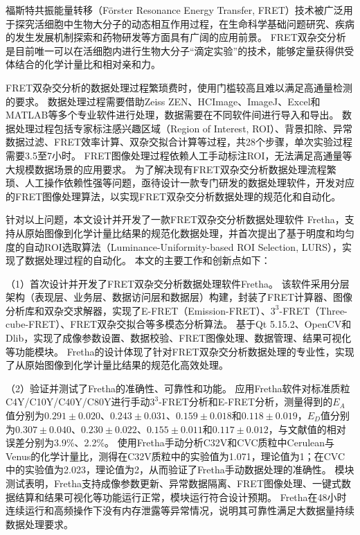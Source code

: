 \begin{cabstract}
福斯特共振能量转移（Förster Resonance Energy Transfer, FRET）技术被广泛用于探究活细胞中生物大分子的动态相互作用过程，在生命科学基础问题研究、疾病的发生发展机制探索和药物研发等方面具有广阔的应用前景。
FRET双杂交分析是目前唯一可以在活细胞内进行生物大分子“滴定实验”的技术，能够定量获得供受体结合的化学计量比和相对亲和力。

FRET双杂交分析的数据处理过程繁琐费时，使用门槛较高且难以满足高通量检测的要求。
数据处理过程需要借助Zeiss ZEN、HCImage、ImageJ、Excel和MATLAB等多个专业软件进行处理，数据需要在不同软件间进行导入和导出。
数据处理过程包括专家标注感兴趣区域（Region of Interest, ROI）、背景扣除、异常数据过滤、FRET效率计算、双杂交拟合计算等过程，共28个步骤，单次实验过程需要3.5至7小时。
FRET图像处理过程依赖人工手动标注ROI，无法满足高通量等大规模数据场景的应用要求。
为了解决现有FRET双杂交分析数据处理流程繁琐、人工操作依赖性强等问题，亟待设计一款专门研发的数据处理软件，开发对应的FRET图像处理算法，以实现FRET双杂交分析数据处理的规范化和自动化。

针对以上问题，本文设计并开发了一款FRET双杂交分析数据处理软件 Fretha，支持从原始图像到化学计量比结果的规范化数据处理，并首次提出了基于明度和均匀度的自动ROI选取算法（Luminance-Uniformity-based ROI Selection, LURS），实现了数据处理过程的自动化。
本文的主要工作和创新点如下：

（1）首次设计并开发了FRET双杂交分析数据处理软件Fretha。
该软件采用分层架构（表现层、业务层、数据访问层和数据层）构建，封装了FRET计算器、图像分析库和双杂交求解器，实现了E-FRET（Emission-FRET）、$3^3$-FRET（Three-cube-FRET）、FRET双杂交拟合等多模态分析算法。
基于Qt 5.15.2、OpenCV和Dlib，实现了成像参数设置、数据校验、FRET图像处理、数据管理、结果可视化等功能模块。
Fretha的设计体现了针对FRET双杂交分析数据处理的专业性，实现了从原始图像到化学计量比结果的规范化高效处理。

（2）验证并测试了Fretha的准确性、可靠性和功能。
应用Fretha软件对标准质粒C4Y/C10Y/C40Y/C80Y进行手动$3^3$-FRET分析和E-FRET分析，测量得到的$E_{A}$值分别为$0.291\pm0.020$、$0.243\pm0.031$、$0.159\pm0.018$和$0.118\pm0.019$，$E_{D}$值分别为$0.307\pm0.040$、$0.230\pm0.022$、$0.155\pm0.011$和$0.117\pm0.012$，与文献值的相对误差分别为3.9\%、2.2\%。
使用Fretha手动分析C32V和CVC质粒中Cerulean与Venus的化学计量比，测得在C32V质粒中的实验值为1.071，理论值为1；在CVC中的实验值为2.023，理论值为2，从而验证了Fretha手动数据处理的准确性。
模块测试表明，Fretha支持成像参数更新、异常数据隔离、FRET图像处理、一键式数据结算和结果可视化等功能运行正常，模块运行符合设计预期。
Fretha在48小时连续运行和高频操作下没有内存泄露等异常情况，说明其可靠性满足大数据量持续数据处理要求。


\end{cabstract}

